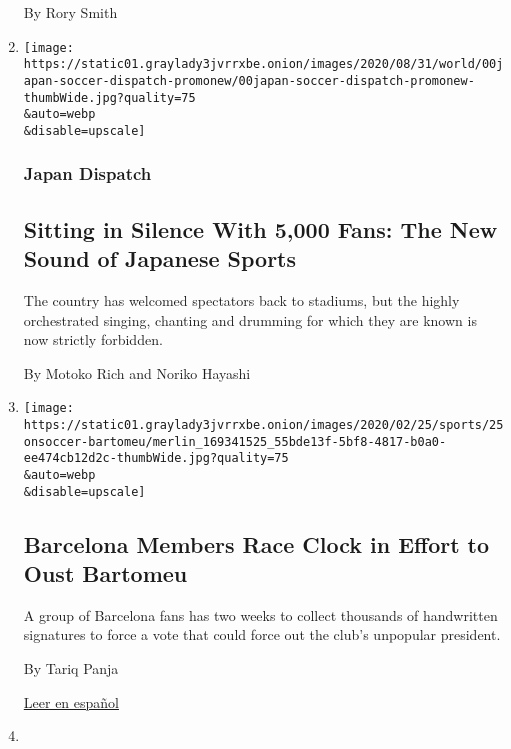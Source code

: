 \begin{enumerate}
  By Rory Smith
\item
  \href{/2020/09/09/world/asia/japan-coronavirus-jleague-soccer.html}{}

  \texttt{[image: https://static01.graylady3jvrrxbe.onion/images/2020/08/31/world/00japan-soccer-dispatch-promonew/00japan-soccer-dispatch-promonew-thumbWide.jpg?quality=75\\\&auto=webp\\\&disable=upscale]}

  \hypertarget{japan-dispatch}{%
  \subsubsection{Japan Dispatch}\label{japan-dispatch}}

  \hypertarget{sitting-in-silence-with-5000-fans-the-new-sound-of-japanese-sports}{%
  \subsection{Sitting in Silence With 5,000 Fans: The New Sound of
  Japanese
  Sports}\label{sitting-in-silence-with-5000-fans-the-new-sound-of-japanese-sports}}

  The country has welcomed spectators back to stadiums, but the highly
  orchestrated singing, chanting and drumming for which they are known
  is now strictly forbidden.

  By Motoko Rich and Noriko Hayashi
\item
  \href{/2020/09/08/sports/soccer/barcelona-bartomeu.html}{}

  \texttt{[image: https://static01.graylady3jvrrxbe.onion/images/2020/02/25/sports/25onsoccer-bartomeu/merlin\_169341525\_55bde13f-5bf8-4817-b0a0-ee474cb12d2c-thumbWide.jpg?quality=75\\\&auto=webp\\\&disable=upscale]}

  \hypertarget{barcelona-members-race-clock-in-effort-to-oust-bartomeu}{%
  \subsection{Barcelona Members Race Clock in Effort to Oust
  Bartomeu}\label{barcelona-members-race-clock-in-effort-to-oust-bartomeu}}

  A group of Barcelona fans has two weeks to collect thousands of
  handwritten signatures to force a vote that could force out the club's
  unpopular president.

  By Tariq Panja

  \href{https://www.nytimes3xbfgragh.onion/es/2020/09/10/espanol/deportes/barcelona-bartomeu.html}{Leer
  en español}
\item
  \href{/2020/09/04/sports/soccer/lionel-messi-barcelona.html}{}


\end{enumerate}
